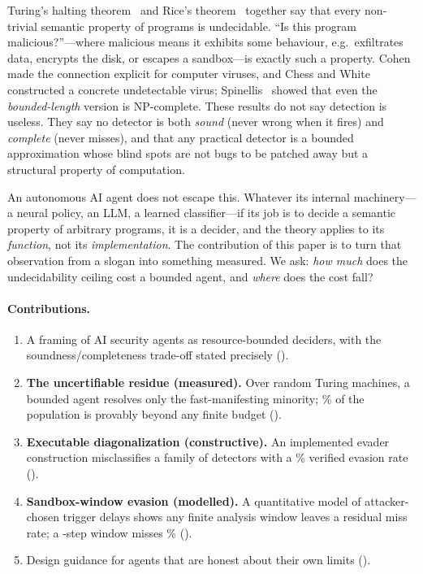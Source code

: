 \documentclass[11pt]{article}
\theoremstyle{plain}
\theoremstyle{definition}
\begin{document}
Turing's halting theorem~\cite{turing1936} and Rice's theorem~\cite{rice1953}
together say that every non-trivial semantic property of programs is
undecidable. ``Is this program malicious?''---where malicious means it
exhibits some behaviour, e.g.\ exfiltrates data, encrypts the disk, or escapes
a sandbox---is exactly such a property. Cohen~\cite{cohen1987} made the
connection explicit for computer viruses, and Chess and
White~\cite{chesswhite2000} constructed a concrete undetectable virus;
Spinellis~\cite{spinellis2003} showed that even the \emph{bounded-length}
version is \textsc{NP}-complete. These results do not say detection is useless.
They say no detector is both \emph{sound} (never wrong when it fires) and
\emph{complete} (never misses), and that any practical detector is a bounded
approximation whose blind spots are not bugs to be patched away but a
structural property of computation.

An autonomous AI agent does not escape this. Whatever its internal
machinery---a neural policy, an LLM, a learned classifier---if its job is to
decide a semantic property of arbitrary programs, it is a decider, and the
theory applies to its \emph{function}, not its \emph{implementation}. The
contribution of this paper is to turn that observation from a slogan into
something measured. We ask: \emph{how much} does the undecidability ceiling
cost a bounded agent, and \emph{where} does the cost fall?

\paragraph{Contributions.}
\begin{enumerate}[leftmargin=1.4em,itemsep=2pt]
  \item A framing of AI security agents as resource-bounded deciders, with the
  soundness/completeness trade-off stated precisely ().
  \item \textbf{The uncertifiable residue (measured).} Over \expN{} random
  Turing machines, a bounded agent resolves only the fast-manifesting
  minority; \expNonhaltPct\% of the population is provably beyond any finite
  budget ().
  \item \textbf{Executable diagonalization (constructive).} An implemented
  evader construction misclassifies a family of \expDetN{} detectors with a
  \expEvRate\% verified evasion rate ().
  \item \textbf{Sandbox-window evasion (modelled).} A quantitative model of
  attacker-chosen trigger delays shows any finite analysis window leaves a
  residual miss rate; a \expSbWindow-step window misses \expSbFnr\%
  ().
  \item Design guidance for agents that are honest about their own limits
  ().
\end{enumerate}
\end{document}
